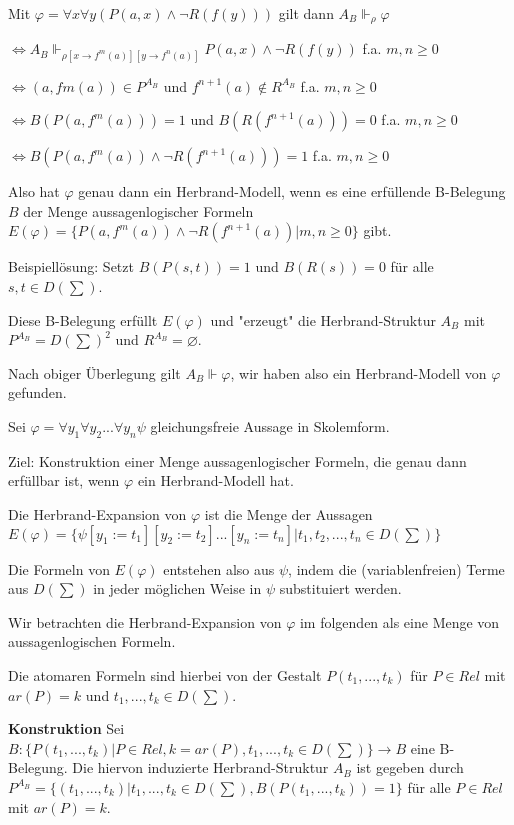 \documentclass[a4paper]{article}
\renewcommand{\note}[2]{\begin{noteBox} \textbf{#1} #2 \end{noteBox}}
\begin{document}
\begin{multicols}{3}
  Mit $\varphi=\forall x\forall y(P(a,x)\wedge\lnot R(f(y)))$ gilt dann $A_B \Vdash_\rho \varphi$
  \begin{itemize*}
    \item $\Leftrightarrow A_B \Vdash_{\rho[x\rightarrow f^m(a)][y\rightarrow f^n(a)]} P(a,x)\wedge\lnot R(f(y))$ f.a. $m,n\geq 0$
    \item $\Leftrightarrow (a,fm(a))\in P^{A_B}$ und $f^{n+1}(a)\not\in R^{A_B}$ f.a. $m,n\geq 0$
    \item $\Leftrightarrow B(P(a,f^m(a)))= 1$ und $B(R(f^{n+1} (a)))= 0$ f.a. $m,n\geq 0$
    \item $\Leftrightarrow B(P(a,f^m(a))\wedge\lnot R(f^{n+1} (a)))= 1$ f.a. $m,n\geq 0$
  \end{itemize*}

  Also hat $\varphi$ genau dann ein Herbrand-Modell, wenn es eine erfüllende B-Belegung $B$ der Menge aussagenlogischer Formeln $E(\varphi)=\{P(a,f^m(a))\wedge\lnot R(f^{n+1}(a)) | m,n\geq 0\}$ gibt.

  Beispiellösung: Setzt $B(P(s,t))= 1$ und $B(R(s))= 0$ für alle $s,t\in D(\sum)$.

  Diese B-Belegung erfüllt $E(\varphi)$ und "erzeugt" die Herbrand-Struktur $A_B$ mit $P^{A_B}=D(\sum)^2$ und $R^{A_B}=\varnothing$.

  Nach obiger Überlegung gilt $A_B\Vdash\varphi$, wir haben also ein Herbrand-Modell von $\varphi$ gefunden.


  Sei $\varphi=\forall y_1\forall y_2...\forall y_n\psi$ gleichungsfreie Aussage in Skolemform.

  Ziel: Konstruktion einer Menge aussagenlogischer Formeln, die genau dann erfüllbar ist, wenn $\varphi$  ein Herbrand-Modell hat.

  Die Herbrand-Expansion von $\varphi$  ist die Menge der Aussagen $E(\varphi)=\{\psi[y_1:=t_1][y_2:=t_2]...[y_n:=t_n]|t_1,t_2,...,t_n\in D(\sum)\}$

  Die Formeln von $E(\varphi)$ entstehen also aus $\psi$, indem die (variablenfreien) Terme aus $D(\sum)$ in jeder möglichen Weise in $\psi$ substituiert werden.

  Wir betrachten die Herbrand-Expansion von $\varphi$ im folgenden als eine Menge von aussagenlogischen Formeln.

  Die atomaren Formeln sind hierbei von der Gestalt $P(t_1,...,t_k)$ für $P\in Rel$ mit $ar(P)=k$ und $t_1,...,t_k\in D(\sum)$.

  \note{Konstruktion}{Sei $B:\{P(t_1,...,t_k)|P\in Rel,k=ar(P),t_1,...,t_k\in D(\sum)\}\rightarrow B$ eine
    B-Belegung. Die hiervon induzierte Herbrand-Struktur $A_B$ ist gegeben durch $P^{A_B} = \{(t_1,...,t_k)|t_1,...,t_k\in D(\sum),B(P(t_1,...,t_k))= 1\}$ für alle $P\in Rel$ mit $ar(P)=k$. }


\end{multicols}
\end{document}
